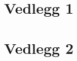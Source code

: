 \documentclass[main.tex]{subfiles}
\begin{document}
\appendix
\section{Vedlegg 1}

\section{Vedlegg 2}
\label{sec:tokolonnenotat}
\end{document}
